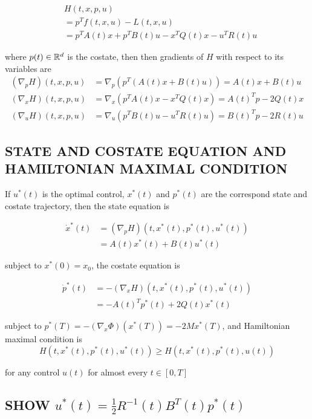 \begin{align*}
	&H(t, x, p, u)  \\
	&= p^T f(t, x, u) - L(t, x, u) \\
	&=  p^T A(t) x + p^T B(t) u - x^T Q(t) x - u^T R(t) u
\end{align*}

where $p(t) \in \mathbb{R}^d$ is the costate, then then gradients of $H$ with respect to its variables are
\begin{align*}
	(\nabla_p H)(t, x, p, u) &= \nabla_p (p^T (A(t) x + B(t) u) ) = A(t) x + B(t) u \\
	(\nabla_x H)(t, x, p, u) &= \nabla_x (p^T A(t) x - x^T Q(t) x) = A(t)^T p - 2 Q(t) x \\
	(\nabla_u H)(t, x, p, u) &= \nabla_u (p^T B(t) u - u^T R(t) u) = B(t)^T p - 2 R(t) u
	\end{align*}

\subsection{STATE AND COSTATE EQUATION AND HAMILTONIAN MAXIMAL CONDITION}

If $u^*(t)$ is the optimal control, $x^*(t)$ and $p^*(t)$ are the correspond state and costate trajectory, then the state equation is

\begin{align*}
	\dot{x}^* (t) 
	&= (\nabla_p H)(t, x^*(t), p^*(t), u^*(t)) \\
	&= A(t) x^*(t) + B(t) u^*(t)
\end{align*}

subject to $x^*(0) = x_0$, the costate equation is

\begin{align*}
	\dot{p}^*(t) 
	&= - (\nabla_x H)(t, x^*(t), p^*(t), u^*(t))\\
	&= - A(t)^T p^*(t) + 2 Q(t) x^*(t)
\end{align*}

subject to $p^*(T) = - (\nabla_x \Phi)(x^*(T)) = - 2 M x^*(T)$, and Hamiltonian maximal condition is
$$
	H(t, x^*(t), p^*(t), u^*(t)) \geq H(t, x^*(t), p^*(t), u(t))
$$

for any control $u(t)$ for almost every $t \in [0, T]$

\subsection{SHOW $u^*(t) = \frac{1}{2} R^{-1}(t) B^T(t) p^*(t)$ }


